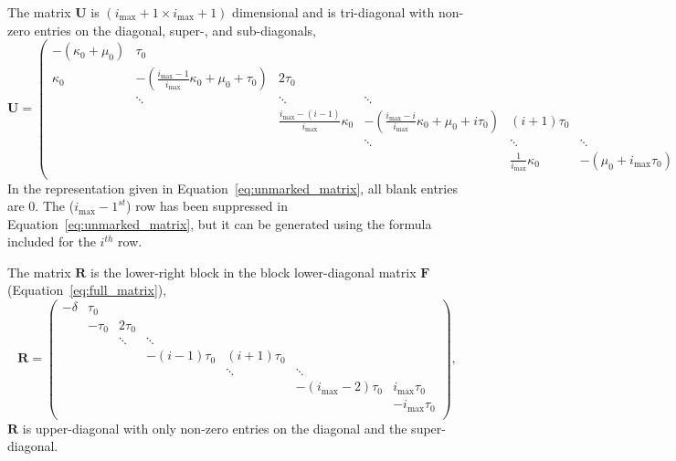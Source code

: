 \documentclass[review]{elsarticle}
\newcommand{\imax}{\ensuremath{i_{\max}}\xspace}
\let\bs\boldsymbol
\begin{document}
The matrix $\bs{U}$ is $(\imax+1\times \imax+1)$ dimensional and is tri-diagonal with non-zero entries on the diagonal, super-, and sub-diagonals,
\begin{equation}
\label{eq:unmarked_matrix}
\bs{U}=\left(\begin{array}{cccccc}
-(\kappa_0+\mu_0) & \tau_0 &  &  &  & \\
\kappa_0 & -\left(\frac{\imax-1}{\imax} \kappa_0+\mu_0+\tau_0\right) & 2\tau_0 &  &  & \\
   &\ddots        & \ddots        & \ddots & &  \\
   & &    \frac{\imax-(i-1)}{\imax}\kappa_0 & -\left(\frac{\imax-i}{\imax}\kappa_0+\mu_0+i\tau_0\right) & (i+1)\tau_0 & \\
                  &         &        & \ddots  & \ddots & \ddots \\
     
                          &        &  &  & \frac{1}{\imax}\kappa_0 & -\left(\mu_0+\imax\tau_0\right) \\
\end{array}\right).
\end{equation}
In the representation given in Equation~\ref{eq:unmarked_matrix}, all blank entries are 0.
The ($\imax-1^{st}$) row has been suppressed in Equation~\ref{eq:unmarked_matrix}, but it can be generated using the formula included for the $i^{th}$ row.

The matrix $\bs{R}$ is the lower-right block in the block lower-diagonal matrix $\bs{F}$ (Equation~\ref{eq:full_matrix}),
\begin{equation}
\label{eq:marked_matrix}
\bs{R}=\left(
\begin{array}{ccccccc}
-\delta & \tau_0 & & & & & \\
 & -\tau_0 & 2\tau_0 & & & &\\
 & & \ddots & \ddots & & & \\
 & & & -(i-1)\tau_0 & (i+1)\tau_0 & & \\
 & & & & \ddots & \ddots & \\
 & & & & & -(\imax-2)\tau_0 & \imax\tau_0 \\
 & & & & & & -\imax\tau_0 \\
\end{array}
\right),
\end{equation}
$\bs{R}$ is upper-diagonal with only non-zero entries on the diagonal and the super-diagonal.
\end{document}
